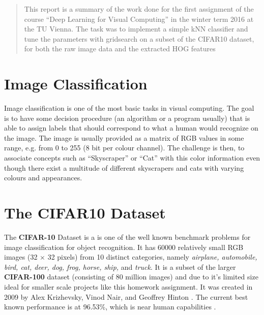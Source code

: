 \newcommand{\ttitle}{kNN Classification and Histograms of Oriented Gradients}
\hyphenation{}
\maketitle



\begin{abstract}
This report is a summary of the work done for the first assignment of the course ``Deep Learning for Visual Computing'' in the winter term 2016 at the TU Vienna. The task was to implement a simple kNN classifier and tune the parameters with gridsearch on a subset of the CIFAR10 dataset, for both the raw image data and the extracted HOG features
\end{abstract}



\section{Image Classification} %
Image classification is one of the most basic tasks in visual computing. The goal is to have some decision procedure (an algorithm or a program usually) that is able to assign labels that should correspond to what a human would recognize on the image. The image is usually provided as a matrix of RGB values in some range, e.g. from 0 to 255 (8 bit per colour channel). The challenge is then, to associate concepts such as ``Skyscraper'' or ``Cat'' with this color information even though there exist a multitude of different skyscrapers and cats with varying colours and appearances.

\section{The CIFAR10 Dataset} %
The \textbf{CIFAR-10} Dataset is a is one of the well known benchmark problems for image classification for object recognition. It has 60000 relatively small RGB images (32 $\times$ 32 pixels) from 10 distinct categories, namely \emph{airplane, automobile, bird, cat, deer, dog, frog, horse, ship,} and \emph{truck}. It is a subset of the larger \textbf{CIFAR-100} dataset (consisting of 80 million images) and due to it's limited size ideal for smaller scale projects like this homework assignment. It was created in 2009 by Alex Krizhevsky, Vinod Nair, and Geoffrey Hinton\cite{CIFAR10} \cite{Krizhevsky09learningmultiple}. The current best known performance is at 96.53\%, which is near human capabilities \cite{Graham14a}.


